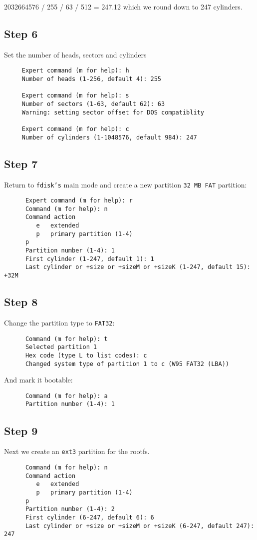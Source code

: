 \documentclass{article}
\begin{document}
      2032664576 / 255 / 63 / 512 = 247.12 which we round down to 247
      cylinders.
   \subsection{Step 6}
     Set the number of heads, sectors and cylinders
     \begin{verbatim}
     Expert command (m for help): h 
     Number of heads (1-256, default 4): 255 

     Expert command (m for help): s 
     Number of sectors (1-63, default 62): 63 
     Warning: setting sector offset for DOS compatiblity 

     Expert command (m for help): c 
     Number of cylinders (1-1048576, default 984): 247
    \end{verbatim}
   \subsection{Step 7}
      Return to \texttt{fdisk's} main mode and create a new partition 
      \texttt{32 MB FAT} partition: 
      \begin{verbatim}
      Expert command (m for help): r 
      Command (m for help): n 
      Command action 
         e   extended 
         p   primary partition (1-4) 
      p 
      Partition number (1-4): 1 
      First cylinder (1-247, default 1): 1 
      Last cylinder or +size or +sizeM or +sizeK (1-247, default 15): +32M
      \end{verbatim}
   \subsection{Step 8}
      Change the partition type to \texttt{FAT32}: 
      \begin{verbatim}
      Command (m for help): t 
      Selected partition 1 
      Hex code (type L to list codes): c 
      Changed system type of partition 1 to c (W95 FAT32 (LBA)) 
      \end{verbatim}

      And mark it bootable: 

      \begin{verbatim}
      Command (m for help): a 
      Partition number (1-4): 1
      \end{verbatim}
   \subsection{Step 9}
      Next we create an \texttt{ext3} partition for the rootfs. 
      \begin{verbatim}
      Command (m for help): n 
      Command action 
         e   extended 
         p   primary partition (1-4) 
      p 
      Partition number (1-4): 2 
      First cylinder (6-247, default 6): 6 
      Last cylinder or +size or +sizeM or +sizeK (6-247, default 247): 247
      \end{verbatim}
\end{document}
